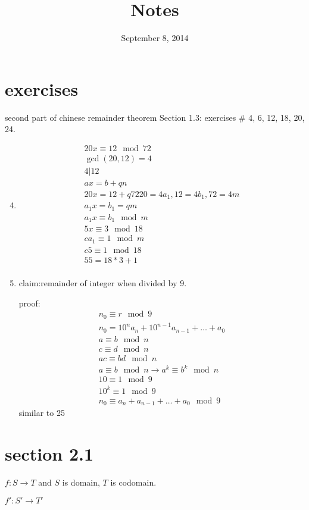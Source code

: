 \documentclass[letterpaper]{article}
\begin{document}
\title{Notes}
\date{September 8, 2014}
\maketitle
\section*{exercises}
second part of chinese remainder theorem
Section 1.3: exercises \# 4, 6, 12, 18, 20, 24.
\begin{enumerate}
\setcounter{enumi}{3}
\item
\begin{align*}
  20x\equiv12\mod 72\\
  \gcd(20,12)=4\\
  4|12\\
  ax=b+qn\\
  20x=12+q72
  20=4a_1,12=4b_1,72=4m\\
  a_1x=b_1=qm\\
  a_1x\equiv b_1\mod m\\
  5x\equiv 3\mod 18\\
  ca_1\equiv1\mod m\\
  c5\equiv1\mod 18\\
  55=18*3+1\\
\end{align*}
\setcounter{enumi}{23}
\item
claim:remainder of integer when divided by 9. 

proof:
\begin{align*}
  n_0\equiv r\mod 9\\
  n_0=10^na_n+10^{n-1}a_{n-1}+\dots+a_0\\
  a\equiv b\mod n\\
  c\equiv d\mod n\\
  ac\equiv bd\mod n\\
  a\equiv b\mod n\to a^k\equiv b^k\mod n\\
  10\equiv1\mod 9\\
  10^k\equiv 1\mod 9\\
  n_0\equiv a_n+a_{n-1}+\dots+a_0\mod 9
\end{align*}
similar to 25
\end{enumerate}
\section*{section 2.1}
$f:S\longrightarrow T$ and $S$ is domain, $T$ is codomain.

$f':S'\longrightarrow T'$
\end{document}
